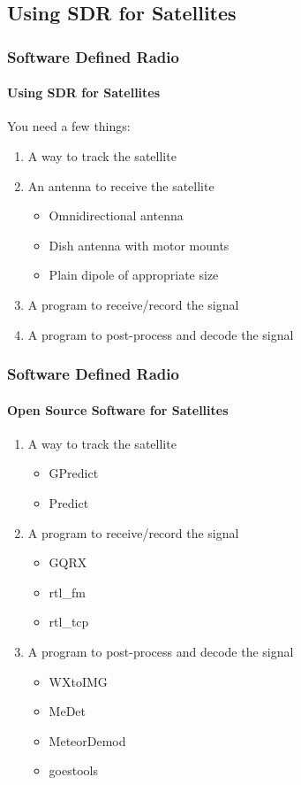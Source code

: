 \documentclass[]{beamer}
\begin{document}
\subsection{Using SDR for Satellites}
\begin{frame}
    \frametitle{Software Defined Radio}
    \framesubtitle{Using SDR for Satellites}
    You need a few things:
    \begin{enumerate}
        \item A way to track the satellite
        \item An antenna to receive the satellite
            \begin{itemize}
                \item Omnidirectional antenna
                \item Dish antenna with motor mounts
                \item Plain dipole of appropriate size
            \end{itemize}
        \item A program to receive/record the signal
        \item A program to post-process and decode the signal
    \end{enumerate}
\end{frame}
\begin{frame}
    \frametitle{Software Defined Radio}
    \framesubtitle{Open Source Software for Satellites}
    \begin{enumerate}
        \item A way to track the satellite
            \begin{itemize}
                \item GPredict
                \item Predict
            \end{itemize}
        \item A program to receive/record the signal
            \begin{itemize}
                \item GQRX
                \item rtl\_fm
                \item rtl\_tcp
            \end{itemize}
        \item A program to post-process and decode the signal
            \begin{itemize}
                \item WXtoIMG
                \item MeDet
                \item MeteorDemod
                \item goestools
            \end{itemize}
    \end{enumerate}
\end{frame}
\end{document}
